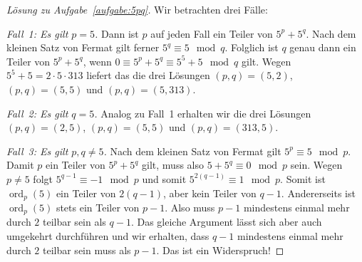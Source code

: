 \begin{proof}[Lösung zu Aufgabe~\ref{aufgabe:5pq}]
	Wir betrachten drei Fälle:
	
	\emph{Fall~1: Es gilt $p=5$.} Dann ist $p$ auf jeden Fall ein Teiler von $5^p+5^q$. Nach dem kleinen Satz von Fermat gilt ferner $5^q\equiv 5\mod q$. Folglich ist $q$ genau dann ein Teiler von $5^p+5^q$, wenn $0\equiv 5^p+5^q\equiv 5^5+5\mod q$ gilt. Wegen $5^5+5=2\cdot 5\cdot 313$ liefert das die drei Lösungen $(p,q)=(5,2)$, $(p,q)=(5,5)$ und $(p,q)=(5,313)$.
	
	\emph{Fall~2: Es gilt $q=5$.} Analog zu Fall~1 erhalten wir die drei Lösungen $(p,q)=(2,5)$, $(p,q)=(5,5)$ und $(p,q)=(313,5)$.
	
	\emph{Fall~3: Es gilt $p,q\neq 5$.} Nach dem kleinen Satz von Fermat gilt $5^p\equiv 5\mod p$. Damit $p$ ein Teiler von $5^p+5^q$ gilt, muss also $5+5^q\equiv 0\mod p$ sein. Wegen $p\neq 5$ folgt $5^{q-1}\equiv -1\mod p$ und somit $5^{2(q-1)}\equiv 1\mod p$. Somit ist $\operatorname{ord}_p(5)$ ein Teiler von $2(q-1)$, aber kein Teiler von $q-1$. Andererseits ist $\operatorname{ord}_p(5)$ stets ein Teiler von $p-1$. Also muss $p-1$ mindestens einmal mehr durch $2$ teilbar sein als $q-1$. Das gleiche Argument lässt sich aber auch umgekehrt durchführen und wir erhalten, dass $q-1$ mindestens einmal mehr durch $2$ teilbar sein muss als $p-1$. Das ist ein Widerspruch!
\end{proof}

